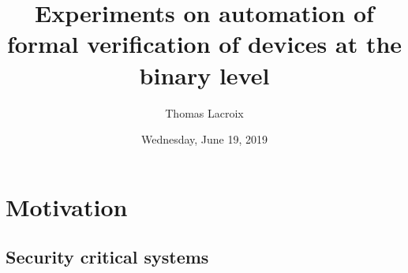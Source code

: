 \documentclass[xcolor={x11names}]{beamer}
\title[Soutenance de PFE]{Experiments on automation of formal verification of devices at the binary level}
\subtitle{}
\author{Thomas Lacroix}
\institute[]{INSA Lyon \\ Soutenance de PFE (Option R\&D)}
\date[19/06/2019]{Wednesday, June 19, 2019}
\begin{document}
\begin{frame}
    \maketitle
\end{frame}


\section{Motivation}


\subsection{Security critical systems}





\end{document}
